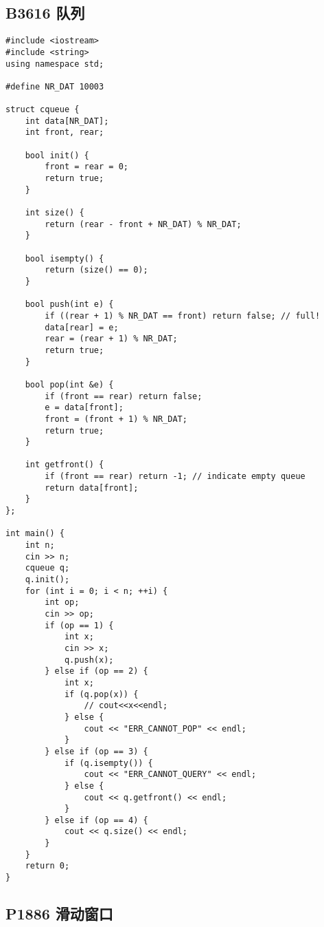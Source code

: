 \documentclass{ctexart}
\begin{document}
\subsection{B3616 队列}

\begin{lstlisting}
#include <iostream>
#include <string>
using namespace std;

#define NR_DAT 10003

struct cqueue {
    int data[NR_DAT];
    int front, rear;

    bool init() {
        front = rear = 0;
        return true;
    } 

    int size() {
        return (rear - front + NR_DAT) % NR_DAT;
    }

    bool isempty() {
        return (size() == 0);
    }

    bool push(int e) {
        if ((rear + 1) % NR_DAT == front) return false; // full!
        data[rear] = e;
        rear = (rear + 1) % NR_DAT;
        return true;
    }
    
    bool pop(int &e) {
        if (front == rear) return false;
        e = data[front];
        front = (front + 1) % NR_DAT;
        return true;
    }

    int getfront() {
        if (front == rear) return -1; // indicate empty queue
        return data[front];
    }
};

int main() {
    int n;
    cin >> n;
    cqueue q;
    q.init();
    for (int i = 0; i < n; ++i) {
        int op;
        cin >> op;
        if (op == 1) {
            int x;
            cin >> x;
            q.push(x);
        } else if (op == 2) {
            int x;
            if (q.pop(x)) {
                // cout<<x<<endl; 
            } else {
                cout << "ERR_CANNOT_POP" << endl;
            }
        } else if (op == 3) {
            if (q.isempty()) {
                cout << "ERR_CANNOT_QUERY" << endl;
            } else {
                cout << q.getfront() << endl;
            }
        } else if (op == 4) {
            cout << q.size() << endl;
        }
    }
    return 0;
}

\end{lstlisting}

\subsection{P1886 滑动窗口}
\end{document}
